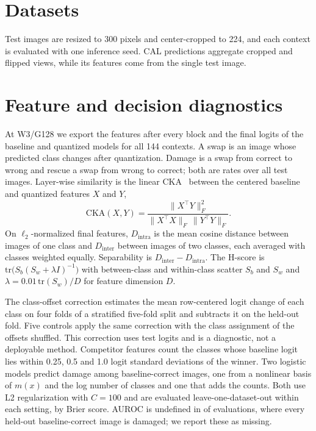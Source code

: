 \section{Datasets}
\label{sec:datasets}



Test images are resized to 300 pixels and center-cropped to 224, and each context is evaluated with one inference seed.
CAL predictions aggregate cropped and flipped views, while its features come from the single test image.

\section{Feature and decision diagnostics}
\label{sec:diagnostics}

At W3/G128 we export the features after every block and the final logits of the baseline and quantized models for all 144 contexts.
A swap is an image whose predicted class changes after quantization.
Damage is a swap from correct to wrong and rescue a swap from wrong to correct; both are rates over all test images.
Layer-wise similarity is the linear CKA~\cite{kornblith2019similarity} between the centered baseline and quantized features $X$ and $Y$,
\begin{equation}
  \mathrm{CKA}(X, Y) = \frac{\lVert X^{\top} Y \rVert_F^2}{\lVert X^{\top} X \rVert_F \, \lVert Y^{\top} Y \rVert_F}.
  \label{eq:cka}
\end{equation}
On $\ell_2$-normalized final features, $D_{\mathrm{intra}}$ is the mean cosine distance between images of one class and $D_{\mathrm{inter}}$ between images of two classes, each averaged with classes weighted equally.
Separability is $D_{\mathrm{inter}} - D_{\mathrm{intra}}$.
The H-score is $\mathrm{tr}\big(S_b (S_w + \lambda I)^{-1}\big)$ with between-class and within-class scatter $S_b$ and $S_w$ and $\lambda = 0.01\,\mathrm{tr}(S_w)/D$ for feature dimension $D$.

The class-offset correction estimates the mean row-centered logit change of each class on four folds of a stratified five-fold split and subtracts it on the held-out fold.
Five controls apply the same correction with the class assignment of the offsets shuffled.
This correction uses test logits and is a diagnostic, not a deployable method.
Competitor features count the classes whose baseline logit lies within 0.25, 0.5 and 1.0 logit standard deviations of the winner.
Two logistic models predict damage among baseline-correct images, one from a nonlinear basis of $m(x)$ and the log number of classes and one that adds the counts.
Both use L2 regularization with $C=100$ and are evaluated leave-one-dataset-out within each setting, by Brier score.
AUROC is undefined in  of  evaluations, where every held-out baseline-correct image is damaged; we report these as missing.

